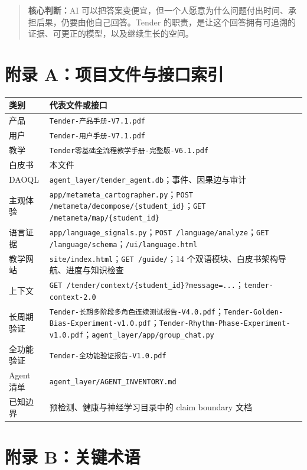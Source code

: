 \documentclass[UTF8,a4paper,11pt]{ctexart}
\newcommand{\keypoint}[1]{\begin{quote}\noindent\textbf{\color{TenderBlue}核心判断：}#1\end{quote}}
\begin{document}
\keypoint{AI 可以把答案变便宜，但一个人愿意为什么问题付出时间、承担后果，仍要由他自己回答。Tender 的职责，是让这个回答拥有可追溯的证据、可更正的模型，以及继续生长的空间。}

\newpage
\appendix
\section{附录 A：项目文件与接口索引}

\begin{center}
\begin{longtable}{@{}p{4.2cm}p{8.8cm}@{}}
\toprule
\textbf{类别} & \textbf{代表文件或接口} \\
\midrule
产品 & \texttt{Tender-产品手册-V7.1.pdf} \\
用户 & \texttt{Tender-用户手册-V7.1.pdf} \\
教学 & \texttt{Tender零基础全流程教学手册-完整版-V6.1.pdf} \\
白皮书 & 本文件 \\
DAOQL & \texttt{agent\_layer/tender\_agent.db}；事件、因果边与审计 \\
主观体验 & \texttt{app/metameta\_cartographer.py}；\texttt{POST /metameta/decompose/\{student\_id\}}；\texttt{GET /metameta/map/\{student\_id\}} \\
语言证据 & \texttt{app/language\_signals.py}；\texttt{POST /language/analyze}；\texttt{GET /language/schema}；\texttt{/ui/language.html} \\
教学网站 & \texttt{site/index.html}；\texttt{GET /guide/}；14 个双语模块、白皮书架构导航、进度与知识检查 \\
上下文 & \texttt{GET /tender/context/\{student\_id\}?message=...}；\texttt{tender-context-2.0} \\
长周期验证 & \texttt{Tender-长期多阶段多角色连续测试报告-V4.0.pdf}；\texttt{Tender-Golden-Bias-Experiment-v1.0.pdf}；\texttt{Tender-Rhythm-Phase-Experiment-v1.0.pdf}；\texttt{agent\_layer/app/group\_chat.py} \\
全功能验证 & \texttt{Tender-全功能验证报告-V1.0.pdf} \\
Agent 清单 & \texttt{agent\_layer/AGENT\_INVENTORY.md} \\
已知边界 & 预检测、健康与神经学习目录中的 claim boundary 文档 \\
\bottomrule
\end{longtable}
\end{center}

\section{附录 B：关键术语}
\end{document}
